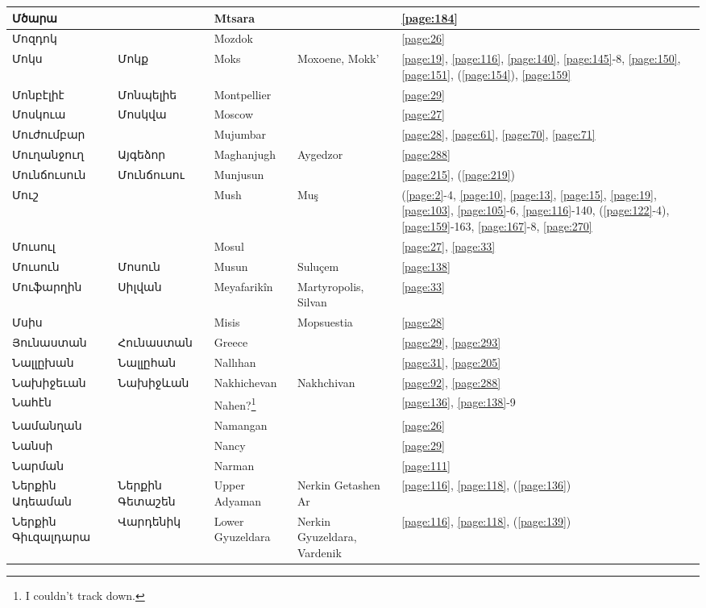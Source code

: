 \begin{center}
\begin{longtable}{|p{}|p{3cm}|p{3cm}|p{2cm}|p{3cm}|}
Մծարա& &Mtsara & &\ref{page:184}\\ \hline
Մոզդոկ& & Mozdok& &\ref{page:26}\\ \hline
Մոկս& Մոկք& Moks&Moxoene, Mokk' &\ref{page:19}, \ref{page:116}, \ref{page:140}, \ref{page:145}-8, \ref{page:150}, \ref{page:151}, (\ref{page:154}), \ref{page:159}\\ \hline
Մոնբէլիէ&Մոնպելիե & Montpellier& &\ref{page:29}\\ \hline
Մոսկուա& Մոսկվա&Moscow & &\ref{page:27}\\ \hline
Մուժումբար& & Mujumbar& &\ref{page:28}, \ref{page:61}, \ref{page:70}, \ref{page:71}\\ \hline
Մուղանջուղ& Այգեձոր &  Maghanjugh &Aygedzor &\ref{page:288}\\ \hline
Մունճուսուն&Մունճուսու&Munjusun & &\ref{page:215}, (\ref{page:219})\\ \hline
Մուշ& & 
Mush&Muş &(\ref{page:2}-4, \ref{page:10}, \ref{page:13}, \ref{page:15}, \ref{page:19}, \ref{page:103}, \ref{page:105}-6, \ref{page:116}-140, (\ref{page:122}-4), \ref{page:159}-163, \ref{page:167}-8, \ref{page:270}\\ \hline
Մուսուլ& &Mosul & &\ref{page:27}, \ref{page:33}\\ \hline
Մուսուն& Մոսուն & Musun &Suluçem &\ref{page:138}\\ \hline
Մուֆարղին&Սիլվան &Meyafarikîn &Martyropolis, Silvan &\ref{page:33}\\ \hline
Մսիս& & Misis& Mopsuestia&\ref{page:28}\\ \hline
Յունաստան&Հունաստան & Greece& &\ref{page:29}, \ref{page:293}\\ \hline
Նալլըխան& Նալլըհան &Nallıhan & &\ref{page:31}, \ref{page:205}\\ \hline
Նախիջեւան&Նախիջևան &
Nakhichevan& Nakhchivan&\ref{page:92}, \ref{page:288}\\ \hline
Նահէն& &Nahen?\footnote{I couldn't track down.} & &\ref{page:136}, \ref{page:138}-9\\ \hline
Նամանղան& & Namangan& &\ref{page:26}\\ \hline
Նանսի& & Nancy& &\ref{page:29}\\ \hline
Նարման& & Narman& &\ref{page:111}\\ \hline
Ներքին Ադեաման& Ներքին Գետաշեն& Upper Adyaman&  Nerkin Getashen Ar&\ref{page:116}, \ref{page:118}, (\ref{page:136})\\ \hline
Ներքին Գիւզալդարա& Վարդենիկ &Lower Gyuzeldara & Nerkin Gyuzeldara, Vardenik &\ref{page:116}, \ref{page:118}, (\ref{page:139})\\ \hline

\end{longtable}
\end{center}
